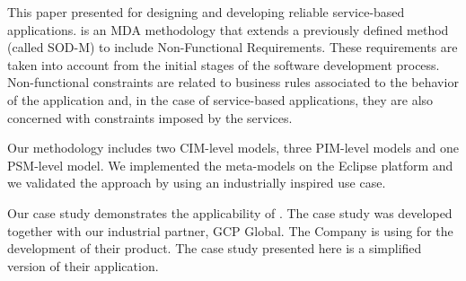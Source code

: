 This paper presented \pisodm for designing and developing reliable service-based applications. 
\pisodm is an MDA methodology that extends a previously defined method (called SOD-M) to include Non-Functional Requirements.
These requirements are taken into account from the initial stages of the software development process.
Non-functional constraints are related to business rules associated to the behavior of the application and, in the case of service-based applications, they are also concerned with constraints imposed by the services. 

Our methodology includes two CIM-level models, three PIM-level models and one PSM-level model. 
We implemented the meta-models on the Eclipse platform and we validated the approach by using an industrially inspired use case.

Our case study demonstrates the applicability of \pisodm.
The case study was developed together with our industrial partner, GCP Global.
The Company is using \pisodm for the development of their product.
The case study presented here is a simplified version of their application.
